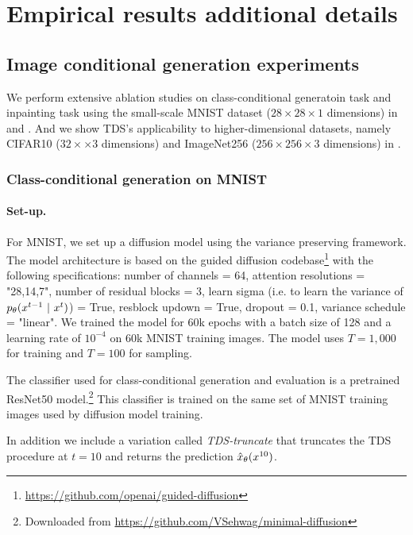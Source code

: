 \section{Empirical results additional details}\label{sec:supp_results}




\subsection{Image conditional generation experiments}
We perform extensive ablation studies on class-conditional generatoin task and inpainting task using the small-scale MNIST dataset ($28\times 28 \times 1$ dimensions) in  and . And we show TDS's applicability to higher-dimensional datasets, namely CIFAR10 ($32\times \times 3$ dimensions) and ImageNet256 ($256\times 256 \times 3$ dimensions) in .


\subsubsection{Class-conditional generation on MNIST}
\label{supp:subsubsec:mnist-class}

\paragraph{Set-up.} For MNIST, we set up a diffusion model using the variance preserving framework. The model architecture is based on the guided diffusion codebase\footnote{\url{https://github.com/openai/guided-diffusion}} with the following specifications: number of channels = 64, attention resolutions = "28,14,7", number of residual blocks = 3, 
learn sigma (i.e. to learn the variance of $p_{\theta}(x^{t-1} ~\vert~ x^{t})$) = True,  resblock updown = True, dropout = 0.1, variance schedule = "linear". We trained the model  for 60k epochs with a batch size of 128 and a learning rate of $10^{-4}$ on 60k MNIST training images. The model uses $T=1,000$ for training and $T=100$ for sampling.  

The classifier used for class-conditional generation and evaluation is a pretrained ResNet50 model.\footnote{Downloaded from \url{https://github.com/VSehwag/minimal-diffusion}}
This classifier is trained on the same set of MNIST training images used by diffusion model training. 


In addition we include a
variation called \textit{TDS-truncate} that truncates the TDS procedure at $t = 10$ and returns the prediction ${\hat x}_\theta (x^{10})$. 

